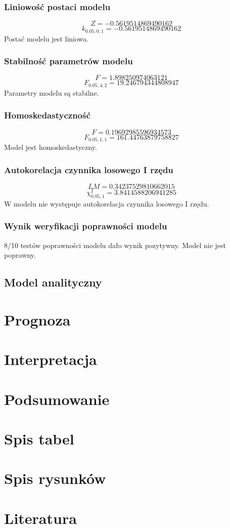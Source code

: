 \documentclass{article}
\begin{document}
\subsubsection{Liniowość postaci modelu}
\[Z = -0.5619514869490162\]
\[k_{0.05, 0, 1} = -0.5619514869490162\]
Postać modelu jest liniowa.
\subsubsection{Stabilność parametrów modelu}
\[F = 1.898250974063121\]
\[F_{0.05, 4, 2} = 19.246794344808947\]
Parametry modelu są stabilne.
\subsubsection{Homoskedastyczność}
\[F = 0.19692985596934573\]
\[F_{0.05, 1, 1} = 161.44763879758827\]
Model jest homoskedastyczny.
\subsubsection{Autokorelacja czynnika losowego I rzędu}
\[LM = 0.34237529810662015\]
\[\chi^2_{0.05, 1} = 3.8414588206941285\]
W modelu nie występuje autokorelacja czynnika losowego I rzędu.
\subsubsection{Wynik weryfikacji poprawności modelu}
8/10 testów poprawności modelu dało wynik pozytywny. Model nie jest poprawny.


\subsection{Model analityczny}


\section{Prognoza}

\section{Interpretacja}

\section{Podsumowanie}

\newpage
\section{Spis tabel}
\renewcommand\listtablename{}
\listoftables


\newpage
\section{Spis rysunków}
\renewcommand\listfigurename{}
\listoffigures


\newpage
\section{Literatura}
\printbibliography[heading=none]
\end{document}
